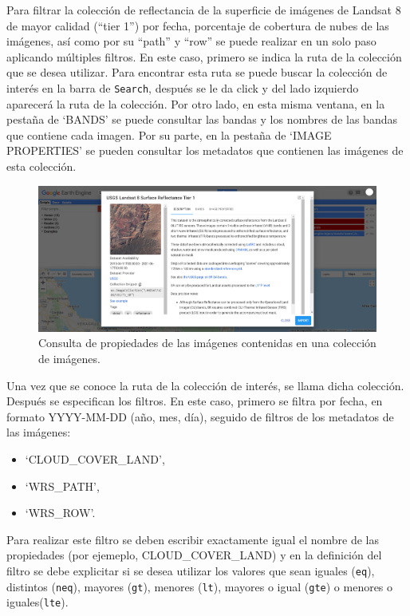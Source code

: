 \documentclass[
  12pt,
  letterpaper,
  twoside]{book}
\providecommand{\tightlist}{%
  \setlength{\itemsep}{0pt}\setlength{\parskip}{0pt}}
\begin{document}
Para filtrar la colección de reflectancia de la superficie de imágenes de Landsat 8 de mayor calidad (``tier 1'') por fecha, porcentaje de cobertura de nubes de las imágenes, así como por su ``path'' y ``row'' se puede realizar en un solo paso aplicando múltiples filtros. En este caso, primero se indica la ruta de la colección que se desea utilizar. Para encontrar esta ruta se puede buscar la colección de interés en la barra de \texttt{Search}, después se le da click y del lado izquierdo aparecerá la ruta de la colección. Por otro lado, en esta misma ventana, en la pestaña de `BANDS' se puede consultar las bandas y los nombres de las bandas que contiene cada imagen. Por su parte, en la pestaña de `IMAGE PROPERTIES' se pueden consultar los metadatos que contienen las imágenes de esta colección.

\begin{figure}

{\centering \includegraphics[width=1\linewidth]{Img/Ruta_coleccion} 

}

\caption{Consulta de propiedades de las imágenes contenidas en una colección de imágenes.}\label{fig:unnamed-chunk-141}
\end{figure}

Una vez que se conoce la ruta de la colección de interés, se llama dicha colección. Después se especifican los filtros. En este caso, primero se filtra por fecha, en formato YYYY-MM-DD (año, mes, día), seguido de filtros de los metadatos de las imágenes:

\begin{itemize}
\tightlist
\item
  `CLOUD\_COVER\_LAND',
\item
  `WRS\_PATH',
\item
  `WRS\_ROW'.
\end{itemize}

Para realizar este filtro se deben escribir exactamente igual el nombre de las propiedades (por ejemeplo, CLOUD\_COVER\_LAND) y en la definición del filtro se debe explicitar si se desea utilizar los valores que sean iguales (\texttt{eq}), distintos (\texttt{neq}), mayores (\texttt{gt}), menores (\texttt{lt}), mayores o igual (\texttt{gte}) o menores o iguales(\texttt{lte}).
\end{document}
